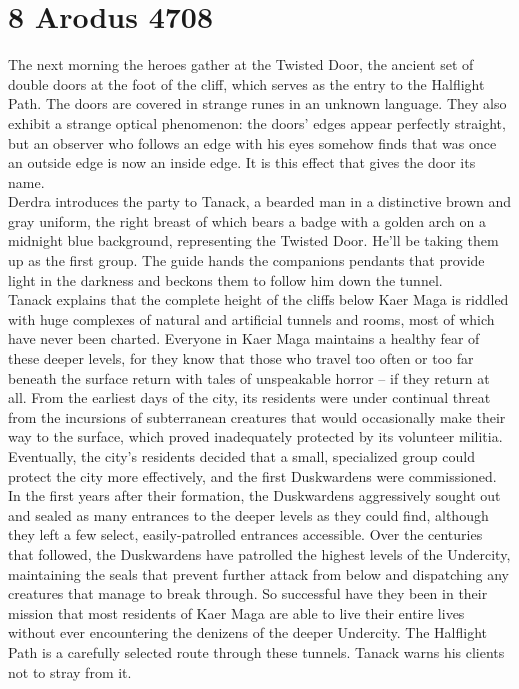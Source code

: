 \section{8 Arodus 4708}

The next morning the heroes gather at the Twisted Door, the ancient set of double doors at the foot of the cliff, which serves as the entry to the Halflight Path. The doors are covered in strange runes in an unknown language. They also exhibit a strange optical phenomenon: the doors' edges appear perfectly straight, but an observer who follows an edge with his eyes somehow finds that was once an outside edge is now an inside edge. It is this effect that gives the door its name.\\

Derdra introduces the party to Tanack, a bearded man in a distinctive brown and gray uniform, the right breast of which bears a badge with a golden arch on a midnight blue background, representing the Twisted Door. He'll be taking them up as the first group. The guide hands the companions pendants that provide light in the darkness and beckons them to follow him down the tunnel.\\

Tanack explains that the complete height of the cliffs below Kaer Maga is riddled with huge complexes of natural and artificial tunnels and rooms, most of which have never been charted. Everyone in Kaer Maga maintains a healthy fear of these deeper levels, for they know that those who travel too often or too far beneath the surface return with tales of unspeakable horror -- if they return at all. From the earliest days of the city, its residents were under continual threat from the incursions of subterranean creatures that would occasionally make their way to the surface, which proved inadequately protected by its volunteer militia. Eventually, the city's residents decided that a small, specialized group could protect the city more effectively, and the first Duskwardens were commissioned. In the first years after their formation, the Duskwardens aggressively sought out and sealed as many entrances to the deeper levels as they could find, although they left a few select, easily-patrolled entrances accessible. Over the centuries that followed, the Duskwardens have patrolled the highest levels of the Undercity, maintaining the seals that prevent further attack from below and dispatching any creatures that manage to break through. So successful have they been in their mission that most residents of Kaer Maga are able to live their entire lives without ever encountering the denizens of the deeper Undercity. The Halflight Path is a carefully selected route through these tunnels. Tanack warns his clients not to stray from it.\\

